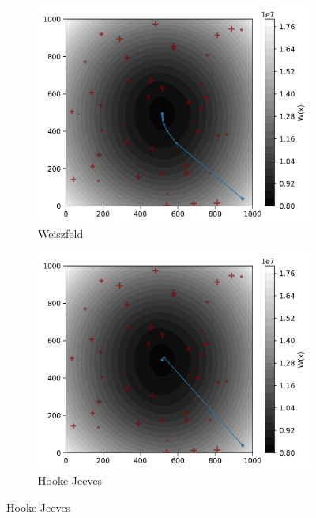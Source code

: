 \documentclass[10pt]{article}
\begin{document}
\begin{figure}[htbp]
	\centering
	\begin{subfigure}[t]{0.4\textwidth}
		\centering
		\includegraphics[width=\linewidth]{figuras/recorrido_wz_8.png}
		\caption{Weiszfeld}
	\end{subfigure}
	\hspace{0.005\textwidth}
	\begin{subfigure}[t]{0.4\textwidth}
		\centering
		\includegraphics[width=\linewidth]{figuras/recorrido_hj_8.png}
		\caption{Hooke-Jeeves}
	\end{subfigure}
	\hspace{0.005\textwidth}

\end{figure}
\end{document}
